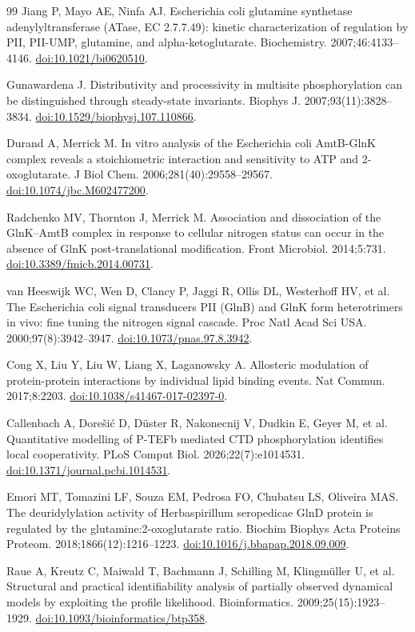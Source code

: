 \documentclass[10pt,letterpaper]{article}
\begin{document}
\begin{singlespace}
\begin{thebibliography}{99}
Jiang P, Mayo AE, Ninfa AJ. Escherichia coli glutamine synthetase adenylyltransferase (ATase, EC 2.7.7.49): kinetic characterization of regulation by PII, PII-UMP, glutamine, and alpha-ketoglutarate. Biochemistry. 2007;46:4133--4146. \href{https://doi.org/10.1021/bi0620510}{doi:10.1021/bi0620510}.

Gunawardena J. Distributivity and processivity in multisite phosphorylation can be distinguished through steady-state invariants. Biophys J. 2007;93(11):3828--3834. \href{https://doi.org/10.1529/biophysj.107.110866}{doi:10.1529/biophysj.107.110866}.

Durand A, Merrick M. In vitro analysis of the Escherichia coli AmtB-GlnK complex reveals a stoichiometric interaction and sensitivity to ATP and 2-oxoglutarate. J Biol Chem. 2006;281(40):29558--29567. \href{https://doi.org/10.1074/jbc.M602477200}{doi:10.1074/jbc.M602477200}.

Radchenko MV, Thornton J, Merrick M. Association and dissociation of the GlnK--AmtB complex in response to cellular nitrogen status can occur in the absence of GlnK post-translational modification. Front Microbiol. 2014;5:731. \href{https://doi.org/10.3389/fmicb.2014.00731}{doi:10.3389/fmicb.2014.00731}.

van Heeswijk WC, Wen D, Clancy P, Jaggi R, Ollis DL, Westerhoff HV, et al. The Escherichia coli signal transducers PII (GlnB) and GlnK form heterotrimers in vivo: fine tuning the nitrogen signal cascade. Proc Natl Acad Sci USA. 2000;97(8):3942--3947. \href{https://doi.org/10.1073/pnas.97.8.3942}{doi:10.1073/pnas.97.8.3942}.

Cong X, Liu Y, Liu W, Liang X, Laganowsky A. Allosteric modulation of protein-protein interactions by individual lipid binding events. Nat Commun. 2017;8:2203. \href{https://doi.org/10.1038/s41467-017-02397-0}{doi:10.1038/s41467-017-02397-0}.

Callenbach A, Dorešić D, Düster R, Nakonecnij V, Dudkin E, Geyer M, et al. Quantitative modelling of P-TEFb mediated CTD phosphorylation identifies local cooperativity. PLoS Comput Biol. 2026;22(7):e1014531. \href{https://doi.org/10.1371/journal.pcbi.1014531}{doi:10.1371/journal.pcbi.1014531}.

Emori MT, Tomazini LF, Souza EM, Pedrosa FO, Chubatsu LS, Oliveira MAS. The deuridylylation activity of Herbaspirillum seropedicae GlnD protein is regulated by the glutamine:2-oxoglutarate ratio. Biochim Biophys Acta Proteins Proteom. 2018;1866(12):1216--1223. \href{https://doi.org/10.1016/j.bbapap.2018.09.009}{doi:10.1016/j.bbapap.2018.09.009}.

Raue A, Kreutz C, Maiwald T, Bachmann J, Schilling M, Klingm{\"u}ller U, et al. Structural and practical identifiability analysis of partially observed dynamical models by exploiting the profile likelihood. Bioinformatics. 2009;25(15):1923--1929. \href{https://doi.org/10.1093/bioinformatics/btp358}{doi:10.1093/bioinformatics/btp358}.

\end{thebibliography}
\end{singlespace}
\end{document}
